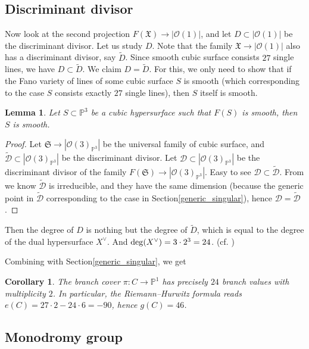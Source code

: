 \documentclass{article}
\newtheorem{corollary}[theorem]{Corollary}
\newtheorem{lemma}[theorem]{Lemma}
\begin{document}
\subsection{Discriminant divisor}
Now look at the second projection $F(\mathfrak X)\to |\mathcal O(1)|$, and let $D\subset |\mathcal O(1)|$ be the discriminant divisor. Let us study $D$. Note that the family $\mathfrak X \to |\mathcal O(1)|$ also has a discriminant divisor, say $\tilde D$. Since smooth cubic surface consists $27$ single lines, we have $D\subset \tilde D$. We claim $D= \tilde D$. For this, we only need to show that if the Fano variety of lines of some cubic surface $S$ is smooth (which corresponding to the case $S$ consists exactly $27$ single lines), then $S$ itself is smooth.

\begin{lemma}
Let $S\subset \mathbb P^3$ be a cubic hypersurface such that $F(S)$ is smooth, then $S$ is smooth.
\end{lemma}

\begin{proof}
Let $\mathfrak S\to |\mathcal O(3)_{\mathbb P^3}|$ be the universal family of cubic surface, and $\tilde{\mathcal D}\subset |\mathcal O(3)_{\mathbb P^3}|$ be the discriminant divisor. Let $\mathcal D\subset |\mathcal O(3)_{\mathbb P^3}|$ be the discriminant divisor of the family $F(\mathfrak S) \to |\mathcal O(3)_{\mathbb P^3}|$. Easy to see $\mathcal D \subset \tilde {\mathcal D}$. From \cite[Thm. 2.2]{Huy} we know $\tilde {\mathcal D}$ is irreducible, and they have the same dimension (because the generic point in $\tilde {\mathcal D}$ corresponding to the case in Section\ref{generic_singular}), hence $\mathcal D=\tilde{\mathcal D}$.
\end{proof}

Then the degree of $D$ is nothing but the degree of $\tilde D$, which is equal to the degree of the dual hypersurface $X^\vee$. And ${\rm deg}(X^\vee)= 3\cdot 2^3=24$. (cf. \cite[Prop.2.9]{EH})

Combining with Section\ref{generic_singular}, we get

\begin{corollary}
 The branch cover $\pi \colon C\to \mathbb P^1$ has precisely $24$ branch values with multiplicity $2$. In particular, the Riemann--Hurwitz formula reads $e(C)=27\cdot 2 -24 \cdot 6=-90$, hence $g(C)=46$.
\end{corollary}

\subsection{Monodromy group}
\end{document}
